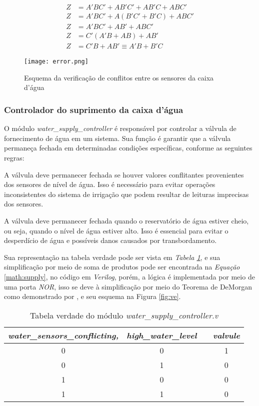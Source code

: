 \documentclass[
	article,			%
	11pt,				%
	oneside,			%
	a4paper,			%
	english,			%
	brazil,				%
	sumario=tradicional
	]{abntex2}
\begin{document}
\begin{equation}
\begin{split}
Z &= A'BC' + AB'C' + AB'C + ABC' \\
Z &= A'BC' + A(B'C' + B'C)  + ABC'\\
Z &= A'BC' + AB' + ABC' \\
Z &= C'(A'B + AB) + AB' \\
Z &= C'B + AB' \equiv A'B + B'C
\label{math:checker}
\end{split}
\end{equation}

\begin{figure}[H]
    \centering
    \texttt{[image: error.png]}
    \caption{Esquema da verificação de conflitos entre os sensores da caixa d'água}
    \label{fig:error}
\end{figure}



\subsubsection{Controlador do suprimento da caixa d’água}

O módulo \textit{water\_supply\_controller} é responsável por controlar a válvula de fornecimento de água em um sistema. 
Sua função é garantir que a válvula permaneça fechada em determinadas condições específicas, conforme as seguintes regras:

A válvula deve permanecer fechada se houver valores conflitantes provenientes dos sensores de nível de água. 
Isso é necessário para evitar operações inconsistentes do sistema de irrigação que podem resultar de leituras imprecisas dos sensores.

A válvula deve permanecer fechada quando o reservatório de água estiver cheio, ou seja, quando o nível de água estiver alto.
Isso é essencial para evitar o desperdício de água e possíveis danos causados por transbordamento.

Sua representação na tabela verdade pode ser vista em \textit{Tabela \ref{tab:water-supply}}, e sua simplificação por meio de soma de produtos pode ser encontrada na \textit{Equação} \eqref{math:supply}, no código em \textit{Verilog}, porém, a lógica é implementada por meio de uma porta \textit{NOR}, isso se deve à simplificação por meio do Teorema de DeMorgan como demonstrado por \cite{floyd_2007_lgebra}, e seu esquema na Figura \ref{fig:ve}.

\begin{table}[h]
\centering
\begin{tabular}{|c|c|c|c|}
\hline
\textit{water\_sensors\_conflicting,} & \multicolumn{1}{l|}{\textit{high\_water\_level}} & \textit{} & \textit{valvule} \\ \hline
0 & 0 &  & 1 \\ \hline
0 & 1 &  & 0 \\ \hline
1 & 0 &  & 0 \\ \hline
1 & 1 &  & 0 \\ \hline
\end{tabular}
\caption{Tabela verdade do módulo \textit{water\_supply\_controller.v}}
\label{tab:water-supply}
\end{table}
\end{document}
